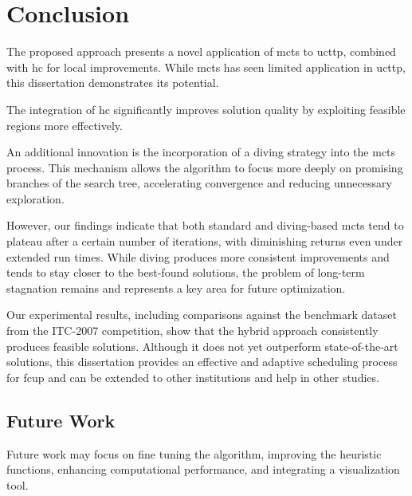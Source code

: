 
\chapter{Conclusion}


\label{Conclusion}

The proposed approach presents a novel application of \ac{mcts} to \ac{ucttp}, combined with \ac{hc} for local improvements. While \ac{mcts} has seen limited application in \ac{ucttp}, this dissertation demonstrates its potential.

The integration of \ac{hc} significantly improves solution quality by exploiting feasible regions more effectively.

An additional innovation is the incorporation of a diving strategy into the \ac{mcts} process. This mechanism allows the algorithm to focus more deeply on promising branches of the search tree, accelerating convergence and reducing unnecessary exploration.

However, our findings indicate that both standard and diving-based \ac{mcts} tend to plateau after a certain number of iterations, with diminishing returns even under extended run times. While diving produces more consistent improvements and tends to stay closer to the best-found solutions, the problem of long-term stagnation remains and represents a key area for future optimization.

Our experimental results, including comparisons against the benchmark dataset from the ITC-2007 competition, show that the hybrid approach consistently produces feasible solutions. Although it does not yet outperform state-of-the-art solutions, this dissertation provides an effective and adaptive scheduling process for \ac{fcup} and can be extended to other institutions and help in other studies. 

\section{Future Work}

Future work may focus on fine tuning the algorithm, improving the heuristic functions, enhancing computational performance, and integrating a visualization tool.

